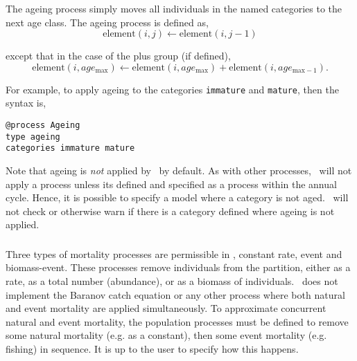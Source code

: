 \subsubsection{\label{sec:ageing}}

The ageing process simply moves all individuals in the named categories to the next age class. The ageing process is defined as,
\begin{equation}
  \text{element}(i,j) \leftarrow \text{element}(i,j-1)
\end{equation}

except that in the case of the plus group (if defined), 
\begin{equation}
  \text{element}(i,age_{\text{max}}) \leftarrow \text{element}(i,age_{\text{max}}) + \text{element}(i,age_{\text{max}-1}).
\end{equation}

For example, to apply ageing to the categories \texttt{immature} and \texttt{mature}, then the syntax is,

{\small{\begin{verbatim}
@process Ageing
type ageing
categories immature mature
\end{verbatim}}}

Note that ageing is \emph{not} applied by \iSAM\ by default. As with other processes, \iSAM\ will not apply a process unless its defined and specified as a process within the annual cycle. Hence, it is possible to specify a model where a category is not aged. \iSAM\ will not check or otherwise warn if there is a category defined where ageing is not applied.

\subsubsection{\label{sec:mortality}}

Three types of mortality processes are permissible in \iSAM, constant rate, event and biomass-event. These processes remove individuals from the partition, either as a rate, as a total number (abundance), or as a biomass of individuals. \iSAM\ does not implement the Baranov catch equation or any other process where both natural and event mortality are applied simultaneously. To approximate concurrent natural and event mortality, the population processes must be defined to remove some natural mortality (e.g. as a constant), then some event mortality (e.g. fishing) in sequence. It is up to the user to specify how this happens.

